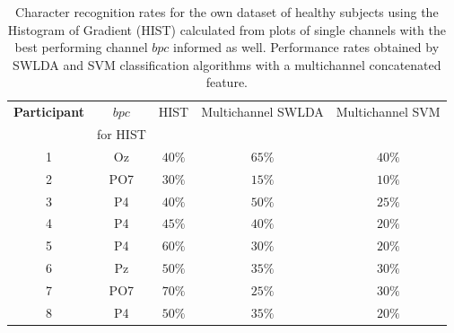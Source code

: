 \documentclass[utf8]{frontiersSCNS} %
\begin{document}
\begin{table}[htb]
\caption{Character recognition rates for the own dataset of healthy subjects using the Histogram of Gradient (HIST) calculated from plots of single channels with the best performing channel $bpc$ informed as well.   Performance rates obtained by SWLDA and SVM classification algorithms with a multichannel concatenated feature.}
\centering
\begin{tabular}{c|cc|c|c}
\toprule
\textbf{Participant}	&  $bpc$ 	&  HIST & Multichannel SWLDA & Multichannel SVM  \\
                                    &  for HIST        &           &                                       &   \\
\midrule
1     &     Oz   &     $40\%$  &     $65\%$  &     $40\%$ \\
2     &     PO7   &     $30\%$ &   $15\%$  &     $10\%$ \\
3     &     P4   &     $40\%$ &     $50\%$  &     $25\%$ \\
4     &     P4   &     $45\%$ &     $40\%$  &     $20\%$ \\
5     &     P4   &      $60\%$ &    $30\%$  &     $20\%$ \\
6     &     Pz   &      $50\%$ &    $35\%$  &     $30\%$ \\
7     &     PO7   &      $70\%$ &  $25\%$  &     $30\%$ \\
8     &     P4   &      $50\%$ &    $35\%$  &     $20\%$ \\

\end{tabular}
\label{tab:resultsownswlda}
\end{table}
\end{document}
